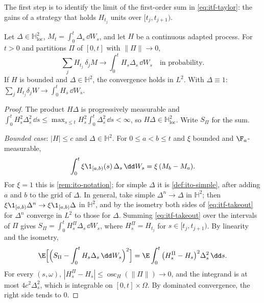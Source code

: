 The first step is to identify the limit of the first-order sum in \eqref{eq:itf-taylor}: the
gains of a strategy that holds $H_{t_j}$ units over $[t_j,t_{j+1})$.

\begin{lemma}\label{lem:itf-riemann}
Let $\Delta\in\mathbb H^2_{\mathrm{loc}}$, $M_t=\int_0^t\Delta_s\,\dd W_s$, and let $H$ be a
continuous adapted process. For $t>0$ and partitions $\Pi$ of $[0,t]$ with $\|\Pi\|\to0$,
\[
  \sum_jH_{t_j}\,\delta_jM\longrightarrow\int_0^tH_s\Delta_s\,\dd W_s\quad\text{in probability.}
\]
If $H$ is bounded and $\Delta\in\mathbb H^2$, the convergence holds in $L^2$. With $\Delta\equiv1$:
$\sum_jH_{t_j}\delta_jW\to\int_0^tH_s\,\dd W_s$.
\end{lemma}

\begin{proof}
The product $H\Delta$ is progressively measurable and
$\int_0^tH_s^2\Delta_s^2\,\dd s\le\max_{s\le t}H_s^2\int_0^t\Delta_s^2\,\dd s<\infty$, so
$H\Delta\in\mathbb H^2_{\mathrm{loc}}$. Write $S_\Pi$ for the sum.

\emph{Bounded case}: $|H|\le c$ and $\Delta\in\mathbb H^2$. For $0\le a<b\le t$ and $\xi$ bounded
and $\F_a$-measurable,
\begin{equation}\label{eq:itf-takeout}
  \int_0^t\xi\1_{[a,b)}(s)\,\Delta_s\,\dd W_s=\xi\,(M_b-M_a).
\end{equation}
For $\xi=1$ this is \cref{rem:ito-notation}; for simple $\Delta$ it is \cref{def:ito-simple}, after
adding $a$ and $b$ to the grid of $\Delta$. In general, take simple $\Delta^n\to\Delta$ in $\mathbb H^2$; then
$\xi\1_{[a,b)}\Delta^n\to\xi\1_{[a,b)}\Delta$ in $\mathbb H^2$, and by the isometry both sides of
\eqref{eq:itf-takeout} for $\Delta^n$ converge in $L^2$ to those for $\Delta$. Summing
\eqref{eq:itf-takeout} over the intervals of $\Pi$ gives $S_\Pi=\int_0^tH^\Pi_s\Delta_s\,\dd W_s$,
where $H^\Pi_s=H_{t_j}$ for $s\in[t_j,t_{j+1})$. By linearity and the isometry,
\[
  \E\Big[\Big(S_\Pi-\int_0^tH_s\Delta_s\,\dd W_s\Big)^2\Big]=\E\int_0^t\big(H^\Pi_s-H_s\big)^2\Delta_s^2\,\dd s .
\]
For every $(s,\omega)$, $|H^\Pi_s-H_s|\le\operatorname{osc}_H(\|\Pi\|)\to0$, and the integrand is at
most $4c^2\Delta_s^2$, which is integrable on $[0,t]\times\Omega$. By dominated convergence, the
right side tends to $0$.


\end{proof}

